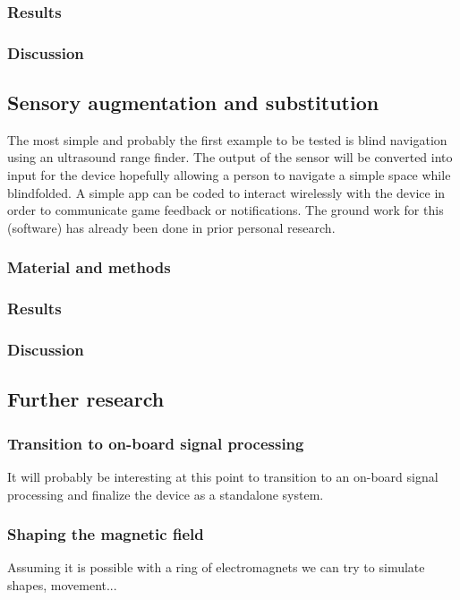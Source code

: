 \documentclass[10pt,journal,compsoc]{IEEEtran}
\begin{document}
		\subsubsection{Results}
		
		\subsubsection{Discussion}
	
	
	\subsection{Sensory augmentation and substitution}
		The most simple and probably the first example to be tested is blind navigation using an ultrasound range finder.
		The output of the sensor will be converted into input for the device hopefully allowing a person to navigate a simple space while blindfolded.
		A simple app can be coded to interact wirelessly with the device in order to communicate game feedback or notifications. The ground work for this (software) has already been done in prior personal research.
		\subsubsection {Material and methods}
		
		\subsubsection{Results}
		
		\subsubsection{Discussion}
		
	\subsection{Further research}
		\subsubsection{Transition to on-board signal processing}
		It will probably be interesting at this point to transition to an on-board signal processing and finalize the device as a standalone system.
		\subsubsection{Shaping the magnetic field}
		Assuming it is possible with a ring of electromagnets we can try to simulate shapes, movement...
\end{document}
